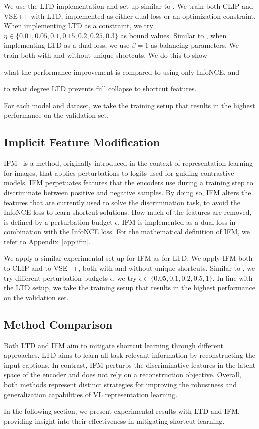  We use the \ac{LTD} implementation and set-up similar to \citet{bleeker2023reducing}. 
We train both CLIP and VSE++ with \ac{LTD}, implemented as either dual loss or an optimization constraint.
When implementing \ac{LTD} as a constraint, we try $\eta \in \{0.01, 0.05, 0.1, 0.15, 0.2, 0.25, 0.3\}$ as bound values.
Similar to \cite{bleeker2023reducing}, when implementing \ac{LTD} as a dual loss, we use $\beta=1$ as balancing parameters.   
We train both with and without unique shortcuts.  
We do this to show 
\begin{enumerate*}[label=(\roman*)]
	\item what the performance improvement is compared to using only InfoNCE, and 
	\item to what degree \ac{LTD} prevents full collapse to shortcut features.
\end{enumerate*}
For each model and dataset, we take the training setup that results in the highest performance on the validation set.

\subsection{Implicit Feature Modification} 
\Acf{IFM}~\citep{robinson2021can} is a method, originally introduced in the context of representation learning for images,
that applies perturbations to logits used for guiding contrastive models. 
\ac{IFM} perpetuates features that the encoders use during a training step to discriminate between positive and negative samples. 
By doing so, \ac{IFM} alters the features that are currently used to solve the discrimination task, to avoid the InfoNCE loss to learn shortcut solutions.  
How much of the features are removed, is defined by a perturbation budget $\epsilon$.
\ac{IFM} is implemented as a dual loss in combination with the InfoNCE loss. 
For the mathematical definition of \ac{IFM}, we refer to Appendix~\ref{app:ifm}.

We apply a similar experimental set-up for \ac{IFM} as for \ac{LTD}.
We apply \ac{IFM} both to CLIP and to VSE++, both with and without unique shortcuts.
Similar to \citep{robinson2021can}, we try different perturbation budgets $\epsilon$, we try $\epsilon \in \{0.05, 0.1, 0.2, 0.5, 1\}$.
In line with the \ac{LTD} setup, we take the training setup that results in the highest performance on the validation set.

\subsection{Method Comparison}
Both \ac{LTD} and \ac{IFM} aim to mitigate shortcut learning through different approaches.
\ac{LTD} aims to learn all task-relevant information by reconstructing the input captions.
In contrast, \ac{IFM} perturbs the discriminative features in the latent space of the encoder and does not rely on a reconstruction objective.
Overall, both methods represent distinct strategies for improving the robustness and generalization capabilities of \ac{VL} representation learning.

In the following section, we present experimental results with \ac{LTD} and \ac{IFM}, providing insight into their effectiveness in mitigating shortcut learning.
